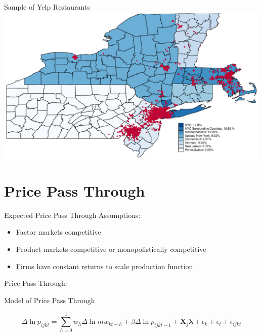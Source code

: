 \documentclass[xcolor=table]{beamer}
\begin{document}
\begin{spacing}{1.2}
\begin{frame}{Sample of Yelp Restaurants}
\centering
\includegraphics[scale=.65]{map_yelp.pdf}

\end{frame}

\section{Price Pass Through}

\begin{frame}{Expected Price Pass Through}
Assumptions:
\begin{itemize}
\item Factor markets competitive
\item Product markets competitive or monopolistically competitive
\item Firms have constant returns to scale production function
\end{itemize}

\bigskip

Price Pass Through:

\bigskip
{}

\bigskip
{}

\end{frame}

\begin{frame} {Model of Price Pass Through}

\begin{dmath}
\Delta \ln p_{ijkt} = \sum_{h=0}^{1}w_h \Delta \ln mw_{kt-h} +  \beta \Delta \ln p_{ijkt-1}  + \boldsymbol{X}_j \boldsymbol{\lambda} + \epsilon_k + \epsilon_t + \epsilon_{ijkt}
\end{dmath}


\end{frame}
\end{spacing}
\end{document}
